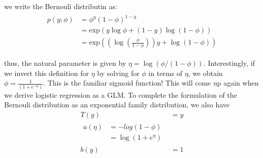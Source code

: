 \documentclass[12pt]{ctexart}%
\begin{document}
		we write the Bernouli distributin as:
		\begin{align}
			\begin{split}
				p(y;\phi) &= \phi^y (1-\phi)^{1-y}\\
						  &= \text{exp}(y\log{\phi} + (1-y)\log{(1-\phi)})\\
						  &= \text{exp}((\log{(\frac{\phi}{1-\phi})})y + \log{(1-\phi)})
			\end{split}
		\end{align}
		
		thus, the natural parameter is given by $\eta = \log{(\phi/(1-\phi))}$. Interestingly, if we invert this definition for $\eta$ by solving for $\phi$ in terms of $\eta$, we obtain $\phi = \frac{1}{(1+e^{-\eta})}$. This is the familiar sigmoid function! This will come up again when we derive logistic regression as a GLM. To complete the formulation of the Bernouli distribution as an exponential family distribution, we also have 
		\begin{align}
			T(y) &= y\\
			\begin{split}
			a(\eta) &= -log(1-\phi)\\
					&= \log(1+e^\eta)
			\end{split}\\
			b(y) & = 1
		\end{align}
		
\end{document}
